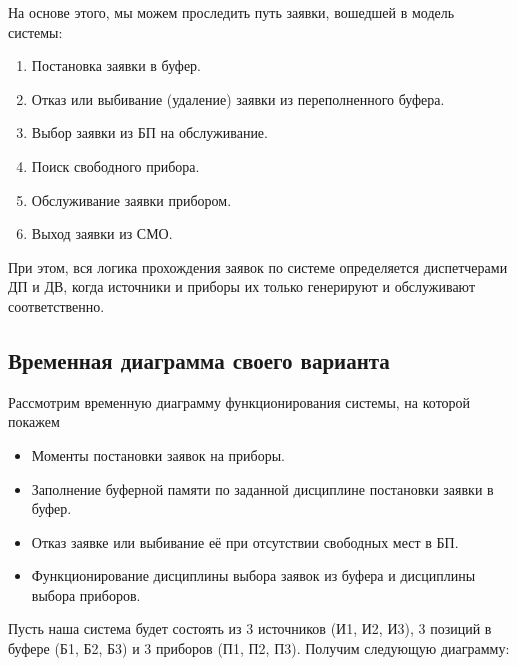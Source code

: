 \documentclass[a4paper, 14pt]{article}
\begin{document}
На основе этого, мы можем проследить путь заявки, вошедшей в модель системы:
\begin{enumerate}
	\item Постановка заявки в буфер.
	\item Отказ или выбивание (удаление) заявки из переполненного буфера.
	\item Выбор заявки из БП на обслуживание.
	\item Поиск свободного прибора.
	\item Обслуживание заявки прибором.
	\item Выход заявки из СМО.
\end{enumerate}
При этом, вся логика прохождения заявок по системе определяется диспетчерами ДП и ДВ, когда источники и приборы их только генерируют и обслуживают соответственно.


\subsection{Временная диаграмма своего варианта}
Рассмотрим временную диаграмму функционирования системы, на которой покажем
\begin{itemize}
	\item Моменты постановки заявок на приборы.
	\item Заполнение буферной памяти по заданной дисциплине постановки заявки в буфер.
	\item Отказ заявке или выбивание её при отсутствии свободных мест в БП.
	\item Функционирование дисциплины выбора заявок из буфера и дисциплины выбора приборов.
\end{itemize}
Пусть наша система будет состоять из 3 источников (И1, И2, И3), 3 позиций в буфере (Б1, Б2, Б3) и 3 приборов (П1, П2, П3). Получим следующую диаграмму:
\end{document}
